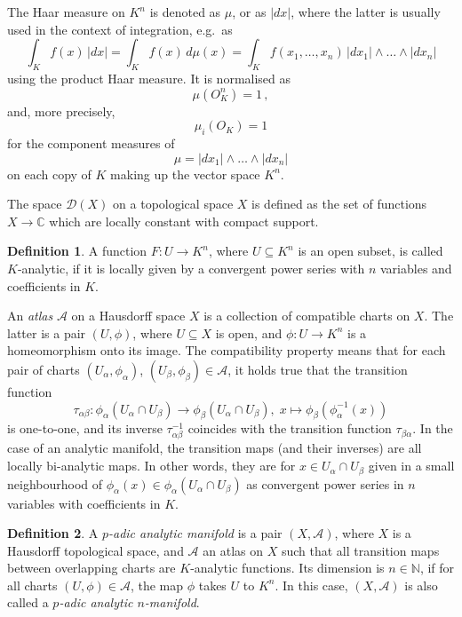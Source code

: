 \documentclass[a4paper,draft]{ZbRad}
\theoremstyle{plain}
\theoremstyle{definition}
\newtheorem{dfn}{Definition}[section]
\numberwithin{equation}{section}
\newcommand{\absolute}[1]{\left\lvert#1\right\rvert}
\begin{document}
The Haar measure on $K^n$ is denoted as $\mu$, or as $\absolute{dx}$, where the latter is usually used in the context of integration, e.g.\ as
\[
\int_Kf(x)\,\absolute{dx}=\int_Kf(x)\,d\mu(x)=\int_Kf(x_1,\dots,x_n)\,\absolute{dx_1}\wedge\dots\wedge\absolute{dx_n}
\]
using the product Haar measure. It is normalised as
\[
\mu(O_K^n)=1\,,
\]
and, more precisely, 
\[
\mu_i(O_K)=1
\]
for the component measures of
\[
\mu=\absolute{dx_1}\wedge\dots\wedge\absolute{dx_n}
\]
on each copy of $K$ making up the vector space $K^n$.
\newline

The space $\mathcal{D}(X)$ on a topological space $X$ is defined as the set of functions $X\to\mathbb{C}$ which are locally constant with compact support.


\begin{dfn}
A function $F\colon U\to K^n$, where $U\subseteq K^n$ is an open subset,
is called $K$-analytic, if it is locally given by a convergent power series with $n$
variables and coeﬃcients in $K$.
\end{dfn}

An \emph{atlas} $\mathcal{A}$ on a Hausdorff space $X$ is a collection of compatible charts on $X$. The latter is a pair $(U,\phi)$, where $U\subseteq X$
is open, and $\phi\colon U\to K^n$ is a homeomorphism onto its image. The compatibility property means that for each pair of charts $(U_\alpha,\phi_\alpha)$, $(U_\beta,\phi_\beta)\in\mathcal{A}$, it
holds true that the transition function
\[
\tau_{\alpha\beta}\colon\phi_\alpha(U_\alpha\cap U_\beta)\to\phi_\beta(U_\alpha\cap U_\beta),\; x\mapsto \phi_\beta(\phi^{-1}_\alpha(x))
\]
is one-to-one, and its inverse $\tau_{\alpha\beta}^{-1}$ coincides with the transition function $\tau_{\beta\alpha}$.
In the case of an analytic manifold, the transition maps (and their inverses) are
all locally bi-analytic maps. In other words, they are for $x \in U_\alpha\cap U_\beta$ given in
a small neighbourhood of $\phi_\alpha(x)\in\phi_\alpha(U_\alpha\cap U_\beta)$ as convergent power series
in $n$ variables with coeﬃcients in $K$.

\begin{dfn}
A \emph{$p$-adic analytic manifold} is a pair $(X,\mathcal{A})$, where $X$ is a
Hausdorff topological space, and $\mathcal{A}$ an atlas on $X$ such that all transition maps
between overlapping charts are $K$-analytic functions. Its dimension is $n\in\mathbb{N}$, if
for all charts $(U,\phi)\in\mathcal{A}$, the map $\phi$ takes $U$ to $K^n$. In this case, $(X,\mathcal{A})$ is also called a \emph{$p$-adic analytic $n$-manifold}.
\end{dfn}
\end{document}
